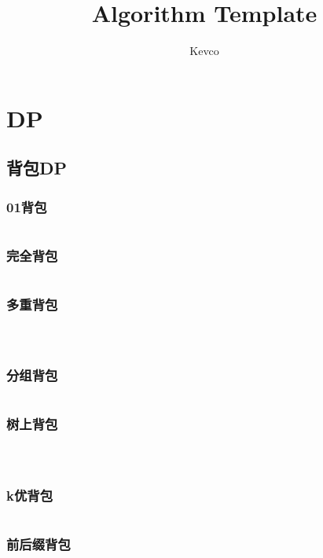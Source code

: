 \documentclass[a4paper,11pt]{article}
\author{Kevco}
\title{Algorithm Template}
\begin{document}
 
\maketitle %
\newpage %
\tableofcontents %
\newpage

\section{DP} %


\subsection{背包DP} %

\subsubsection{01背包} %
\inputminted[breaklines]{c++}{dp/bag/01.cpp}
\newpage %
\subsubsection{完全背包} %
\inputminted[breaklines]{c++}{dp/bag/wanQuan.cpp}
\newpage %
\subsubsection{多重背包} %
\inputminted[breaklines]{c++}{dp/bag/duoChong1.cpp}
\inputminted[breaklines]{c++}{dp/bag/duoChong2.cpp}
\inputminted[breaklines]{c++}{dp/bag/duoChong3.cpp}
\newpage %
\subsubsection{分组背包} %
\inputminted[breaklines]{c++}{dp/bag/fenZu.cpp}
\newpage %
\subsubsection{树上背包} %
\inputminted[breaklines]{c++}{dp/bag/treeBag1.cpp}
\newpage %
\inputminted[breaklines]{c++}{dp/bag/treeBag3.cpp}
\newpage %
\inputminted[breaklines]{c++}{dp/bag/treeBag2.cpp}
\newpage %
\subsubsection{k优背包} %
\inputminted[breaklines]{c++}{dp/bag/k-great.cpp}
\newpage %
\subsubsection{前后缀背包} %
\inputminted[breaklines]{c++}{dp/bag/presuf.cpp}
\newpage %
\end{document}
